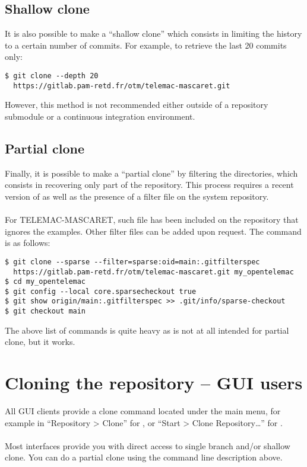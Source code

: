 \subsection{Shallow clone}
It is also possible to make a “shallow clone” which consists in limiting the
history to a certain number of commits. For example, to retrieve the last 20
commits only:

\begin{small}
\begin{lstlisting}
$ git clone --depth 20
  https://gitlab.pam-retd.fr/otm/telemac-mascaret.git
\end{lstlisting}
\end{small}

However, this method is not recommended either outside of a repository
submodule or a continuous integration environment.

\subsection{Partial clone}
Finally, it is possible to make a “partial clone” by filtering the directories,
which consists in recovering only part of the  repository. This
process requires a recent version of  as well as the presence of a
filter file on the system repository.\\
\\
For TELEMAC-MASCARET, such file has been included on the repository that
ignores the examples. Other filter files can be added upon request. The
 command is as follows:
\begin{small}
\begin{lstlisting}
$ git clone --sparse --filter=sparse:oid=main:.gitfilterspec
  https://gitlab.pam-retd.fr/otm/telemac-mascaret.git my_opentelemac
$ cd my_opentelemac
$ git config --local core.sparsecheckout true
$ git show origin/main:.gitfilterspec >> .git/info/sparse-checkout
$ git checkout main
\end{lstlisting}
\end{small}

The above list of commands is quite heavy as  is not at all intended
for partial clone, but it works.

\section{Cloning the repository -- GUI users}
All GUI clients provide a clone command located under the main menu, for
example in ``Repository > Clone'' for , or
``Start > Clone Repository…'' for .\\
\\
Most interfaces provide you with direct access to single branch and/or shallow
clone. You can do a partial clone using the command line description above.


